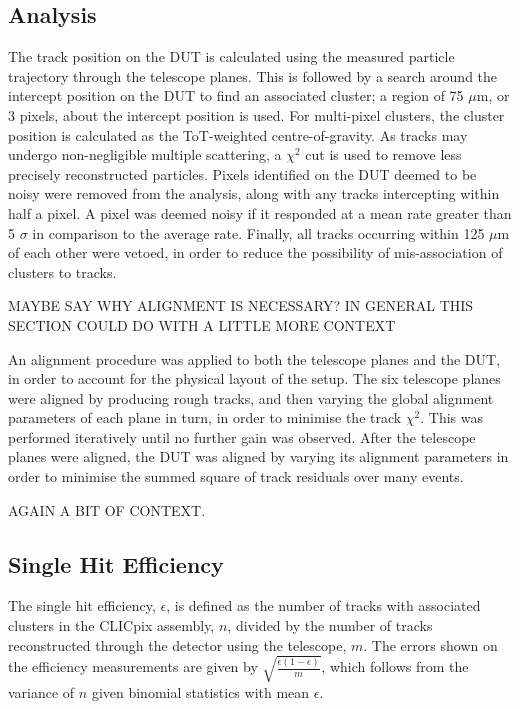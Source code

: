\subsection{Analysis}
The track position on the DUT is calculated using the measured particle trajectory through the telescope planes.  This is followed by a search around the intercept position on the DUT to find an associated cluster; a region of 75 $\mu$m, or 3 pixels, about the intercept position is used.  For multi-pixel clusters, the cluster position is calculated as the ToT-weighted centre-of-gravity.  As tracks may undergo non-negligible multiple scattering, a $\chi^{2}$ cut is used to remove less precisely reconstructed particles. Pixels identified on the DUT deemed to be noisy were removed from the analysis, along with any tracks intercepting within half a pixel.  A pixel was deemed noisy if it responded at a mean rate greater than 5 $\sigma$ in comparison to the average rate.  Finally, all tracks occurring within 125 $\mu$m of each other were vetoed, in order to reduce the possibility of mis-association of clusters to tracks. 

MAYBE SAY WHY ALIGNMENT IS NECESSARY? IN GENERAL THIS SECTION COULD DO WITH A LITTLE MORE CONTEXT

An alignment procedure was applied to both the telescope planes and the DUT, in order to account for the physical layout of the setup.  The six telescope planes were aligned by producing rough tracks, and then varying the global alignment parameters of each plane in turn, in order to minimise the track $\chi^{2}$. This was performed iteratively until no further gain was observed. After the telescope planes were aligned, the DUT was aligned by varying its alignment parameters in order to minimise the summed square of track residuals over many events.


AGAIN A BIT OF CONTEXT.

\subsection{Single Hit Efficiency}
The single hit efficiency, $\epsilon$, is defined as the number of tracks with associated clusters in the CLICpix assembly, $n$, divided by the number of tracks reconstructed through the detector using the telescope, $m$. The errors shown on the efficiency measurements are given by $\sqrt{\frac{\epsilon (1 - \epsilon)}{m}}$, which follows from the variance of $n$ given binomial statistics with mean $\epsilon$.  

